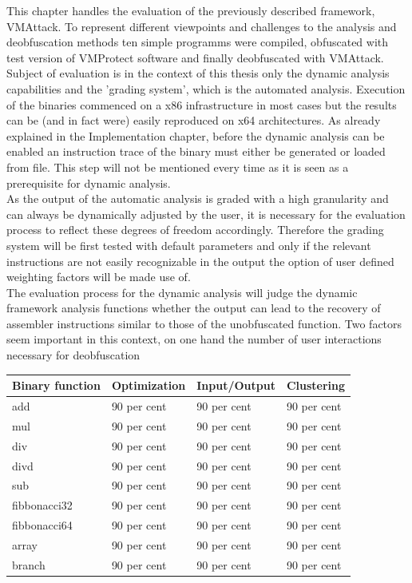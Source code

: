 \documentclass[10pt,twoside,a4paper,bibliography=totoc]{scrbook}
\begin{document}
This chapter handles the evaluation of the previously described framework, VMAttack. To represent different viewpoints and challenges to the analysis and deobfuscation methods ten simple programms were compiled, obfuscated with test version of VMProtect software and finally deobfuscated with VMAttack. Subject of evaluation is in the context of this thesis only the dynamic analysis capabilities and the 'grading system', which is the automated analysis. Execution of the binaries commenced on a x86 infrastructure in most cases but the results can be (and in fact were) easily reproduced on x64 architectures. As already explained in the Implementation\label{sec3:implementation} chapter, before the dynamic analysis can be enabled an instruction trace of the binary must either be generated or loaded from file. This step will not be mentioned every time as it is seen as a prerequisite for dynamic analysis.\\
As the output of the automatic analysis is graded with a high granularity and can always be dynamically adjusted by the user, it is necessary for the evaluation process to reflect these degrees of freedom accordingly. Therefore the grading system will be first tested with default parameters and only if the relevant instructions are not easily recognizable in the output the option of user defined weighting factors will be made use of. \\
The evaluation process for the dynamic analysis will judge the dynamic framework analysis functions whether the output can lead to the recovery of assembler instructions similar to those of the unobfuscated function. Two factors seem important in this context, on one hand the number of user interactions necessary for deobfuscation


\begin{center}
\begin{tabular}{l|l|l|l}
	\hline
	Binary function & Optimization & Input/Output & Clustering\\
	\hline
	add & 90 per cent & 90 per cent & 90 per cent\\
	mul & 90 per cent & 90 per cent & 90 per cent\\
	div & 90 per cent & 90 per cent & 90 per cent\\
	divd & 90 per cent & 90 per cent & 90 per cent\\
	sub & 90 per cent & 90 per cent & 90 per cent\\
	fibbonacci32 & 90 per cent & 90 per cent & 90 per cent\\
	fibbonacci64 & 90 per cent & 90 per cent & 90 per cent\\
	array & 90 per cent & 90 per cent & 90 per cent\\
	branch & 90 per cent & 90 per cent & 90 per cent\\
	\hline
\end{tabular}
\end{center}
\end{document}
